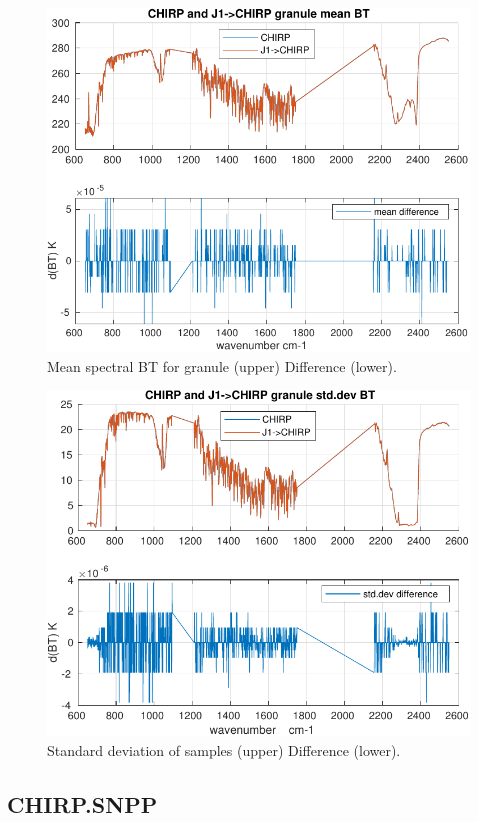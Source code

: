 \documentclass[11pt]{article}
\begin{document}
\begin{figure}[htbp]
\centering
\includegraphics[width=.9\linewidth]{./figs/2020d001g120_chirp_j1_bt_spectrum_mean.pdf}
\caption{\label{fig:org9ce4ece}
Mean spectral BT for granule (upper) Difference (lower).}
\end{figure}

\begin{figure}[htbp]
\centering
\includegraphics[width=.9\linewidth]{./figs/2020d001g120_chirp_j1_bt_spectrum_std.pdf}
\caption{\label{fig:org371f5d2}
Standard deviation of samples (upper) Difference (lower).}
\end{figure}




\subsection{CHIRP.SNPP}
\label{sec:orgbfdef10}
\end{document}
